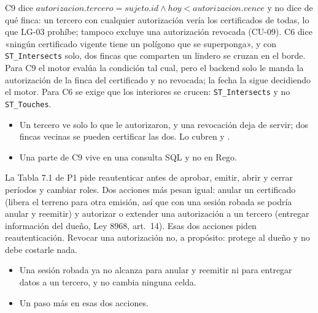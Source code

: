 \documentclass[11pt,a4paper]{article}
\theoremstyle{definition}
\theoremstyle{remark}
\newcommand{\code}[1]{\texttt{#1}}
\begin{document}
\adrctx C9 dice $\mathit{autorizacion.tercero} = \mathit{sujeto.id} \wedge
\mathit{hoy} < \mathit{autorizacion.vence}$ y no dice de qué finca: un tercero
con cualquier autorización vería los certificados de todas, lo que LG-03
prohíbe; tampoco excluye una autorización revocada (CU-09). C6 dice
«ningún certificado vigente tiene un polígono que se superponga», y con
\code{ST\_Intersects} solo, dos fincas que comparten un lindero se cruzan en
el borde.
\adrdec Para C9 el motor evalúa la condición tal cual, pero el backend solo le
manda la autorización de la finca del certificado y no revocada; la fecha la
sigue decidiendo el motor. Para C6 se exige que los interiores se crucen:
\code{ST\_Intersects} y no \code{ST\_Touches}.
\adrpos
\begin{itemize}
  \item Un tercero ve solo lo que le autorizaron, y una revocación deja de
    servir; dos fincas vecinas se pueden certificar las dos. Lo cubren
     y
    .
\end{itemize}
\adrneg
\begin{itemize}
  \item Una parte de C9 vive en una consulta SQL y no en Rego.
\end{itemize}

\adrctx La Tabla 7.1 de P1 pide reautenticar antes de aprobar, emitir, abrir y
cerrar períodos y cambiar roles. Dos acciones más pesan igual: anular un
certificado (libera el terreno para otra emisión, así que con una sesión
robada se podría anular y reemitir) y autorizar o extender una autorización a
un tercero (entregar información del dueño, Ley 8968, art.~14).
\adrdec Esas dos acciones piden reautenticación. Revocar una autorización no,
a propósito: protege al dueño y no debe costarle nada.
\adrpos
\begin{itemize}
  \item Una sesión robada ya no alcanza para anular y reemitir ni para
    entregar datos a un tercero, y no cambia ninguna celda.
\end{itemize}
\adrneg
\begin{itemize}
  \item Un paso más en esas dos acciones.
\end{itemize}
\end{document}

